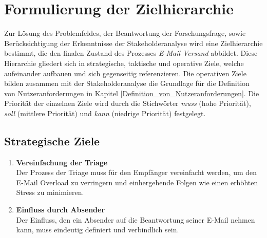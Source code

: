 
\chapter{Formulierung der Zielhierarchie}
\label{Formulierung_der_Zielhierarchie}

Zur Lösung des Problemfeldes, der Beantwortung der Forschungsfrage, sowie Berücksichtigung der Erkenntnisse der Stakeholderanalyse wird eine Zielhierarchie bestimmt, die den finalen Zustand des Prozesses \textit{E-Mail Versand} abbildet. Diese Hierarchie gliedert sich in strategische, taktische und operative Ziele, welche aufeinander aufbauen und sich gegenseitig referenzieren. Die operativen Ziele bilden zusammen mit der Stakeholderanalyse die Grundlage für die Definition von Nutzeranforderungen in Kapitel \ref{Definition_von_Nutzeranforderungen}. Die Priorität der einzelnen Ziele wird durch die Stichwörter \textit{muss} (hohe Priorität), \textit{soll} (mittlere Priorität) und \textit{kann} (niedrige Priorität) festgelegt.


\section{Strategische Ziele}
\begin{enumerate}[label=(\alph*)]
    \item \textbf{Vereinfachung der Triage}\\
        Der Prozess der Triage muss für den Empfänger vereinfacht werden, um den E-Mail Overload zu verringern und einhergehende Folgen wie einen erhöhten Stress zu minimieren.
        
    \item \textbf{Einfluss durch Absender}\\
        Der Einfluss, den ein Absender auf die Beantwortung seiner E-Mail nehmen kann, muss eindeutig definiert und verbindlich sein.
\end{enumerate}


